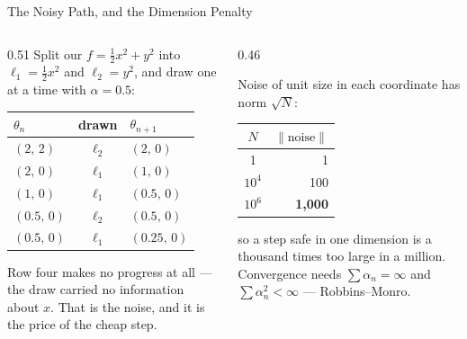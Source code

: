\begin{frame}{The Noisy Path, and the Dimension Penalty}
\begin{columns}[T]
\begin{column}{0.51\textwidth}
\small
Split our $f=\tfrac12x^{2}+y^{2}$ into $\ell_1=\tfrac12x^{2}$ and $\ell_2=y^{2}$, and draw one at a time with $\alpha=0.5$:
\medskip
\begin{center}\scriptsize
\begin{tabularx}{\linewidth}{@{}>{\raggedright\arraybackslash}X c >{\raggedright\arraybackslash}X@{}}
\toprule
$\theta_n$ & \textbf{drawn} & $\theta_{n+1}$ \\
\midrule
$(2,\,2)$ & $\ell_2$ & $(2,\,0)$ \\
$(2,\,0)$ & $\ell_1$ & $(1,\,0)$ \\
$(1,\,0)$ & $\ell_1$ & $(0.5,\,0)$ \\
$(0.5,\,0)$ & $\ell_2$ & $(0.5,\,0)$ \\
$(0.5,\,0)$ & $\ell_1$ & $(0.25,\,0)$ \\
\bottomrule
\end{tabularx}
\end{center}
\medskip
\footnotesize
Row four makes no progress at all --- the draw carried no information about $x$. That is the noise, and it is the price of the cheap step.
\end{column}
\begin{column}{0.46\textwidth}
\begin{cautionbox}[title=\textbf{Why $\alpha$ must shrink with $N$}]\footnotesize
Noise of unit size in each coordinate has norm $\sqrt N$:
\medskip
\begin{center}\scriptsize
\begin{tabular}{@{}c r@{}}
\toprule
$N$ & $\lVert\text{noise}\rVert$ \\
\midrule
1 & 1 \\
$10^{4}$ & 100 \\
$10^{6}$ & \textbf{1{,}000} \\
\bottomrule
\end{tabular}
\end{center}
\medskip
so a step safe in one dimension is a thousand times too large in a million. Convergence needs $\sum\alpha_n=\infty$ and $\sum\alpha_n^{2}<\infty$ --- Robbins--Monro.
\end{cautionbox}
\end{column}
\end{columns}
\vspace{1mm}
\end{frame}

